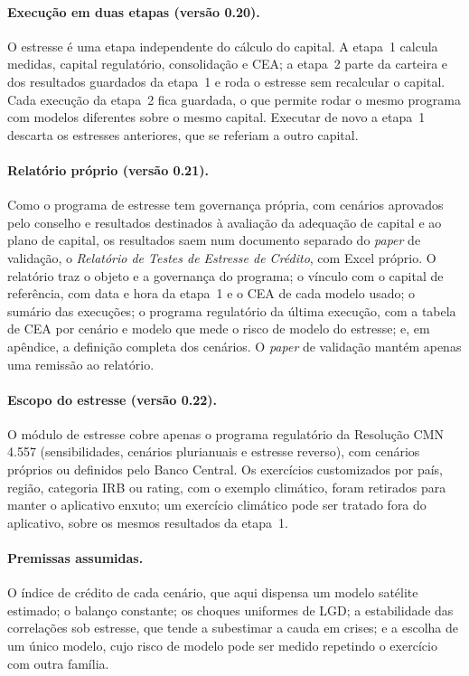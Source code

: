 \documentclass[11pt,a4paper]{article}
\begin{document}
\paragraph{Execução em duas etapas (versão 0.20).} O estresse é uma etapa independente do cálculo do capital. A etapa~1 calcula medidas, capital regulatório, consolidação e CEA; a etapa~2 parte da carteira e dos resultados guardados da etapa~1 e roda o estresse sem recalcular o capital. Cada execução da etapa~2 fica guardada, o que permite rodar o mesmo programa com modelos diferentes sobre o mesmo capital. Executar de novo a etapa~1 descarta os estresses anteriores, que se referiam a outro capital.

\paragraph{Relatório próprio (versão 0.21).} Como o programa de estresse tem governança própria, com cenários aprovados pelo conselho e resultados destinados à avaliação da adequação de capital e ao plano de capital, os resultados saem num documento separado do \emph{paper} de validação, o \emph{Relatório de Testes de Estresse de Crédito}, com Excel próprio. O relatório traz o objeto e a governança do programa; o vínculo com o capital de referência, com data e hora da etapa~1 e o CEA de cada modelo usado; o sumário das execuções; o programa regulatório da última execução, com a tabela de CEA por cenário e modelo que mede o risco de modelo do estresse; e, em apêndice, a definição completa dos cenários. O \emph{paper} de validação mantém apenas uma remissão ao relatório.

\paragraph{Escopo do estresse (versão 0.22).} O módulo de estresse cobre apenas o programa regulatório da Resolução CMN 4.557 (sensibilidades, cenários plurianuais e estresse reverso), com cenários próprios ou definidos pelo Banco Central. Os exercícios customizados por país, região, categoria IRB ou rating, com o exemplo climático, foram retirados para manter o aplicativo enxuto; um exercício climático pode ser tratado fora do aplicativo, sobre os mesmos resultados da etapa~1.

\paragraph{Premissas assumidas.} O índice de crédito de cada cenário, que aqui dispensa um modelo satélite estimado; o balanço constante; os choques uniformes de LGD; a estabilidade das correlações sob estresse, que tende a subestimar a cauda em crises; e a escolha de um único modelo, cujo risco de modelo pode ser medido repetindo o exercício com outra família.
\end{document}
